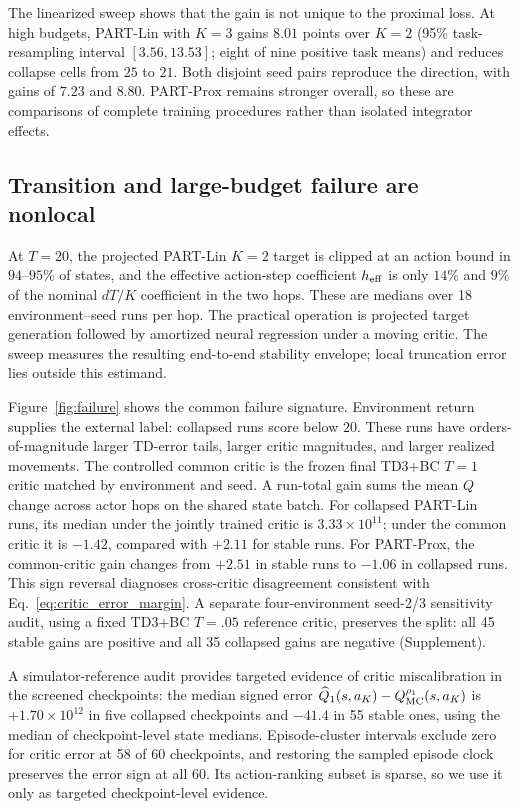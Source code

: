 \documentclass[twoside]{article}
\begin{document}
The linearized sweep shows that the gain is not unique to the proximal loss.
At high budgets, PART-Lin with $K=3$ gains $8.01$ points over $K=2$
(95\% task-resampling interval $[3.56,13.53]$; eight of nine positive task means)
and reduces collapse cells from $25$ to $21$. Both disjoint seed pairs reproduce
the direction, with gains of $7.23$ and $8.80$. PART-Prox remains stronger overall, so these
are comparisons of complete training procedures rather than isolated
integrator effects.

\subsection{Transition and large-budget failure are nonlocal}


At $T=20$, the projected PART-Lin $K=2$ target is clipped at an action bound in
$94$--$95\%$ of states, and the effective action-step coefficient
$h_{\rm eff}$ is only $14\%$ and $9\%$ of the nominal $dT/K$ coefficient in
the two hops. These are medians over 18 environment--seed runs per hop. The
practical operation is projected target generation followed by amortized neural
regression under a moving critic. The sweep measures the resulting end-to-end
stability envelope; local truncation error lies outside this estimand.

Figure~\ref{fig:failure} shows the common failure signature. Environment
return supplies the external label: collapsed runs score below $20$. These
runs have orders-of-magnitude larger TD-error tails, larger critic magnitudes,
and larger realized movements. The controlled common critic is the frozen
final TD3+BC $T=1$ critic matched by environment and seed. A run-total gain
sums the mean $Q$ change across actor hops on the shared state batch. For
collapsed PART-Lin runs, its median under the jointly trained critic is
$3.33\times10^{11}$; under the common critic it is $-1.42$, compared with
$+2.11$ for stable runs. For PART-Prox, the common-critic gain changes from
$+2.51$ in stable runs to $-1.06$ in collapsed runs. This sign reversal
diagnoses cross-critic disagreement consistent with
Eq.~\eqref{eq:critic_error_margin}. A separate four-environment seed-2/3
sensitivity audit,
using a fixed TD3+BC $T=.05$ reference critic, preserves the split: all 45
stable gains are positive and all 35 collapsed gains are negative (Supplement).

A simulator-reference audit provides targeted evidence of critic miscalibration in the screened checkpoints: the
median signed error $\widehat Q_1(s,a_K)-Q_{\rm MC}^{\rho_1}(s,a_K)$ is
$+1.70\times10^{12}$ in five collapsed checkpoints and $-41.4$ in 55 stable
ones, using the median of checkpoint-level state medians. Episode-cluster
intervals exclude zero for critic error at 58 of 60 checkpoints, and restoring
the sampled episode clock preserves the error sign at all 60. Its action-ranking
subset is sparse, so we use it only as targeted checkpoint-level evidence.
\end{document}
